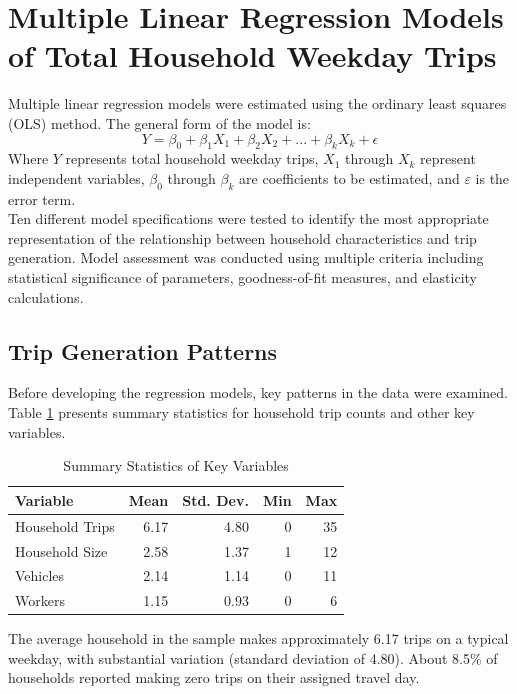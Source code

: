 \documentclass[12pt]{article}
\begin{document}
\section{Multiple Linear Regression Models of Total Household Weekday Trips}
Multiple linear regression models were estimated using the ordinary least squares (OLS) method. The general form of the model is:
\begin{equation}
Y = \beta_0 + \beta_1X_1 + \beta_2X_2 + ... + \beta_kX_k + \epsilon
\end{equation}
Where $Y$ represents total household weekday trips, $X_1$ through $X_k$ represent independent variables, $\beta_0$ through $\beta_k$ are coefficients to be estimated, and $\varepsilon$ is the error term.\\

Ten different model specifications were tested to identify the most appropriate representation of the relationship between household characteristics and trip generation. Model assessment was conducted using multiple criteria including statistical significance of parameters, goodness-of-fit measures, and elasticity calculations.


\subsection{Trip Generation Patterns}
Before developing the regression models, key patterns in the data were examined. Table \ref{tab:trip_stats} presents summary statistics for household trip counts and other key variables.

\begin{table}[h]
\centering
\caption{Summary Statistics of Key Variables}
\label{tab:trip_stats}
\begin{tabular}{lrrrr}
\toprule
Variable & Mean & Std. Dev. & Min & Max \\
\midrule
Household Trips & 6.17 & 4.80 & 0 & 35 \\
Household Size & 2.58 & 1.37 & 1 & 12 \\
Vehicles & 2.14 & 1.14 & 0 & 11 \\
Workers & 1.15 & 0.93 & 0 & 6 \\
\bottomrule
\end{tabular}
\end{table}


The average household in the sample makes approximately 6.17 trips on a typical weekday, with substantial variation (standard deviation of 4.80). About 8.5\% of households reported making zero trips on their assigned travel day.
\end{document}
